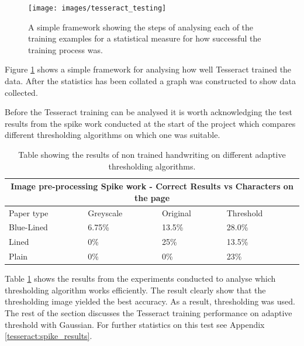 \begin{figure}[h!]
  \centering
  \texttt{[image: images/tesseract\_testing]}
  \caption{A simple framework showing the steps of analysing each of the training examples for a statistical measure for how successful the training process was.}
  \label{fig:tesseract_framework}
\end{figure}

Figure \ref{fig:tesseract_framework} shows a simple framework for analysing how well Tesseract trained the data. After the statistics has been collated a graph was constructed to show data collected.


Before the Tesseract training can be analysed it is worth acknowledging the test results from the spike work conducted at the start of the project which compares different thresholding algorithms on which one was suitable.

\begin{table}[H]
\centering
\begin{tabular}{ ||p{3cm}||p{3cm}|p{3cm}|p{3cm}||  }
 \hline
 \multicolumn{4}{||c||}{Image pre-processing Spike work - Correct Results vs Characters on the page} \\
 \hline
      Paper type & Greyscale & Original & Threshold\\
 \hline
  Blue-Lined &  6.75\% & 13.5\% & 28.0\% \\
  Lined & 0\% & 25\% & 13.5\% \\
  Plain & 0\% & 0\% & 23\% \\
 \hline
\end{tabular}
\caption{Table showing the results of non trained handwriting on different adaptive thresholding algorithms.}
\label{table:pre-training}
\end{table}

Table \ref{table:pre-training} shows the results from the experiments conducted to analyse which thresholding algorithm works efficiently. The result clearly show that the thresholding image yielded the best accuracy. As a result, thresholding was used. The rest of the section discusses the Tesseract training performance on adaptive threshold with Gaussian. For further statistics on this test see Appendix \ref{tesseract:spike_results}.


